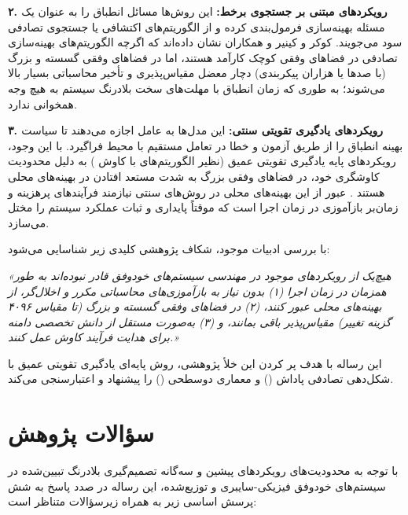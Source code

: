 \documentclass[oneside,openany,phd]{TMU-Thesis}
\begin{document}
\textbf{۲. رویکردهای مبتنی بر جستجوی برخط:} این روش‌ها مسائل انطباق را به عنوان یک مسئله بهینه‌سازی فرمول‌بندی کرده و از الگوریتم‌های اکتشافی یا جستجوی تصادفی سود می‌جویند. کوکر \cite{coker2015sass} و کینیر و همکاران \cite{kinneer2018managing, kinneer2021information} نشان داده‌اند که اگرچه الگوریتم‌های بهینه‌سازی تصادفی در فضاهای وفقی کوچک کارآمد هستند، اما در فضاهای وفقی گسسته و بزرگ (با صدها یا هزاران پیکربندی) دچار معضل مقیاس‌پذیری و تأخیر محاسباتی بسیار بالا می‌شوند؛ به طوری که زمان انطباق با مهلت‌های سخت بلادرنگ سیستم به هیچ وجه همخوانی ندارد.

\textbf{۳. رویکردهای یادگیری تقویتی سنتی:} این مدل‌ها به عامل اجازه می‌دهند تا سیاست بهینه انطباق را از طریق آزمون و خطا در تعامل مستقیم با محیط فراگیرد. با این وجود، رویکردهای پایه یادگیری تقویتی عمیق (نظیر الگوریتم‌های  با کاوش ) به دلیل محدودیت کاوشگری خود، در فضاهای وفقی بزرگ به شدت مستعد افتادن در بهینه‌های محلی هستند \cite{kim2009reinforcement, metzger2022realizing}. عبور از این بهینه‌های محلی در روش‌های سنتی نیازمند فرآیندهای پرهزینه و زمان‌بر بازآموزی در زمان اجرا است که موقتاً پایداری و ثبات عملکرد سیستم را مختل می‌سازد.

با بررسی ادبیات موجود، شکاف پژوهشی کلیدی زیر شناسایی می‌شود:
\begin{center}
\textit{«هیچ‌یک از رویکردهای موجود در مهندسی سیستم‌های خودوفق قادر نبوده‌اند به طور همزمان در زمان اجرا (۱) بدون نیاز به بازآموزی‌های محاسباتی مکرر و اخلال‌گر، از بهینه‌های محلی عبور کنند، (۲) در فضاهای وفقی گسسته و بزرگ (تا مقیاس ۴۰۹۶ گزینه تغییر) مقیاس‌پذیر باقی بمانند، و (۳) به‌صورت مستقل از دانش تخصصی دامنه برای هدایت فرآیند کاوش عمل کنند.»}
\end{center}
این رساله با هدف پر کردن این خلأ پژوهشی، روش پایه‌ای یادگیری تقویتی عمیق با شکل‌دهی تصادفی پاداش () و معماری دوسطحی (\rsdrlplus) را پیشنهاد و اعتبارسنجی می‌کند.

\section{سؤالات پژوهش}

با توجه به محدودیت‌های رویکردهای پیشین و سه‌گانه تصمیم‌گیری بلادرنگ تبیین‌شده در سیستم‌های خودوفق فیزیکی-سایبری و توزیع‌شده، این رساله در صدد پاسخ به شش پرسش اساسی زیر به همراه زیرسؤالات متناظر است:
\end{document}
